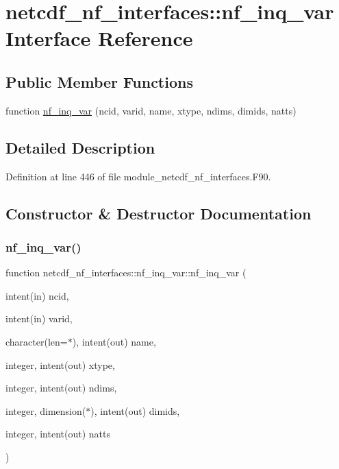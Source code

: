 \hypertarget{interfacenetcdf__nf__interfaces_1_1nf__inq__var}{}\section{netcdf\+\_\+nf\+\_\+interfaces\+:\+:nf\+\_\+inq\+\_\+var Interface Reference}
\label{interfacenetcdf__nf__interfaces_1_1nf__inq__var}
\subsection*{Public Member Functions}
\begin{DoxyCompactItemize}
\item 
function \hyperlink{interfacenetcdf__nf__interfaces_1_1nf__inq__var_abf4e5adeff69578797d74d4fa82a5a48}{nf\+\_\+inq\+\_\+var} (ncid, varid, name, xtype, ndims, dimids, natts)
\end{DoxyCompactItemize}


\subsection{Detailed Description}


Definition at line 446 of file module\+\_\+netcdf\+\_\+nf\+\_\+interfaces.\+F90.



\subsection{Constructor \& Destructor Documentation}
\mbox{\label{interfacenetcdf__nf__interfaces_1_1nf__inq__var_abf4e5adeff69578797d74d4fa82a5a48}} 
\subsubsection{\texorpdfstring{nf\+\_\+inq\+\_\+var()}{nf\_inq\_var()}}
{\footnotesize\ttfamily function netcdf\+\_\+nf\+\_\+interfaces\+::nf\+\_\+inq\+\_\+var\+::nf\+\_\+inq\+\_\+var (\begin{DoxyParamCaption}\item[{intent(in)}]{ncid,  }\item[{intent(in)}]{varid,  }\item[{character(len=$\ast$), intent(out)}]{name,  }\item[{integer, intent(out)}]{xtype,  }\item[{integer, intent(out)}]{ndims,  }\item[{integer, dimension($\ast$), intent(out)}]{dimids,  }\item[{integer, intent(out)}]{natts }\end{DoxyParamCaption})}



